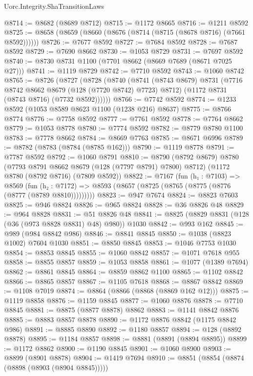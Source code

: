 \begin{lexlean}{Uorc.Integrity.ShaTransitionLaws}
\begin{coremodule}
@8714 := @8682 (@8689 @8712)
@8715 := @1172 @8665
@8716 := @1211 @8592
@8725 := @8658 (@8659 (@8660 (@8676 (@8714 (@8715 (@8678 @8716) (@7661 @8592))))))
@8726 := @7677 @8592
@8727 := @7684 @8592
@8728 := @7687 @8592
@8729 := @7690 @8662
@8730 := @1053 @8729
@8731 := @7697 @8592
@8740 := @8730 @8731 @1100 (@7701 @8662 (@8669 @7689 (@8671 @7025 @27)))
@8741 := @1119 @8729
@8742 := @7710 @8592
@8743 := @1060 @8742
@8765 := @8726
    (@8727
      (@8728
        (@8740
          (@8741
            (@8743 @8679)
            @8731
            (@7716 @8742 @8662 @8679 (@128 (@7720 @8742) @7723) @8712)
            (@1172 @8731 (@8743 @8716) (@7732 @8592))))))
@8766 := @7742 @8592
@8774 := @1233 @8592 (@1053 @8589 @8623 @1100 (@1238 @216) @8637)
@8775 := @8766 @8774
@8776 := @7758 @8592
@8777 := @7761 @8592
@8778 := @7764 @8662
@8779 := @1053 @8778
@8780 := @7774 @8592
@8782 := @8779 @8780 @1100
@8783 := @7778 @8662
@8784 := @8669 @7763
@8785 := @8671 @6996
@8789 := @8782 (@8783 (@8784 (@8785 @162)))
@8790 := @1119 @8778
@8791 := @7787 @8592
@8792 := @1060 @8791
@8810 := @8790
    (@8792 @8679)
    @8780
    (@7793 @8791 @8662 @8679 (@128 (@7797 @8791) @7800) @8712)
    (@1172 @8780 (@8792 @8716) (@7809 @8592))
@8822 := @7167
    (fun (h₁ : @7103) =>
    @8569 (fun (h₂ : @7172) => @8593 (@8657 (@8725 (@8765 (@8775 (@8776 (@8777 (@8789 @8810)))))))))
@8823 := @947 @7674
@8824 := @8823 @7603
@8825 := @946 @8824
@8826 := @965 @8824
@8828 := @36 @8826 @48
@8829 := @964 @8828
@8831 := @51 @8826 @48
@8841 := @8825 (@8829 @8831 (@128 (@36 (@973 @8828 @8831) @48) @980)) @1030
@8842 := @993 @162
@8845 := @989 (@984 @8842 @986)
@8846 := @8841 @8845
@8850 := @1038 (@8823 @1002) @7604 @1030
@8851 := @8850 @8845
@8853 := @1046 @7753 @1030
@8854 := @8853 @8845
@8855 := @1060 @8842
@8857 := @1071 @7618 @955
@8858 := @8855 @8857
@8859 := @1053 @8858
@8861 := @1077 (@1389 @7694)
@8862 := @8861 @8845
@8864 := @8859 @8862 @1100
@8865 := @1102 @8842
@8866 := @8865 @8857
@8867 := @1105 @7618
@8868 := @8867 @8842
@8869 := @1108 @7019
@8874 := @8864 (@8866 (@8868 (@8869 @162 @12)))
@8875 := @1119 @8858
@8876 := @1159 @8845
@8877 := @1060 @8876
@8878 := @7710 @8845
@8881 := @8875 (@8877 @8878) @8862
@8883 := @1141 @8842 @8876
@8885 := @8883 @8857 @8878
@8890 := @1172 @8876 @8842 (@1175 @8842 @986)
@8891 := @8885 @8890
@8892 := @1180 @8857
@8894 := @128 (@8892 @8878)
@8895 := @1184 @8857
@8898 := @8881 (@8891 (@8894 @8895))
@8899 := @1172 @8862
@8900 := @1190 @8845
@8901 := @1060 @8900
@8903 := @8899 (@8901 @8878)
@8904 := @1419 @7694
@8910 := @8851 (@8854 (@8874 (@8898 (@8903 (@8904 @8845)))))

\end{coremodule}
\end{lexlean}
